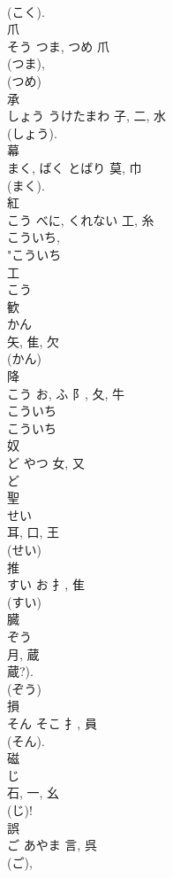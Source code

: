 \documentclass[8pt]{extreport}
\begin{document}
\begin{CJK}{UTF8}{min}
\\	(こく). 
\\	爪	
\\	そう	つま, つめ	爪	
\\	(つま), 
\\	(つめ) 
\\	承	
\\	しょう	うけたまわ	子, 二, 水	
\\	(しょう). 
\\	幕	
\\	まく, ばく	とばり	莫, 巾	
\\	(まく). 
\\	紅	
\\	こう	べに, くれない	工, 糸	
\\	こういち, 
\\	"こういち 
\\	工 
\\	こう 
\\	歓	
\\	かん	
\\	矢, 隹, 欠	
\\	(かん) 
\\	降	
\\	こう	お, ふ	阝, 夂, 牛	
\\	こういち
\\	こういち
\\	奴	
\\	ど	やつ	女, 又	
\\	ど 
\\	聖	
\\	せい	
\\	耳, 口, 王	
\\	(せい) 
\\	推	
\\	すい	お	扌, 隹	
\\	(すい) 
\\	臓	
\\	ぞう	
\\	月, 蔵	
\\	蔵?). 
\\	(ぞう) 
\\	損	
\\	そん	そこ	扌, 員	
\\	(そん). 
\\	磁	
\\	じ	
\\	石, 一, 幺		
\\	(じ)! 
\\	誤	
\\	ご	あやま	言, 呉	
\\	(ご), 

\end{CJK}
\end{document}
